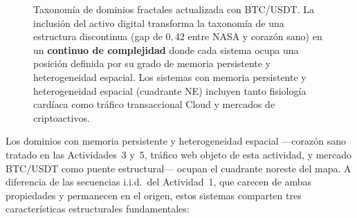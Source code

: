 \begin{figure}[H]
\caption{Taxonomía de dominios fractales actualizada con BTC/USDT. La inclusión
         del activo digital transforma la taxonomía de una estructura
         discontinua (gap de $0{,}42$ entre NASA y corazón sano) en un
         \textbf{continuo de complejidad} donde cada sistema ocupa una posición
         definida por su grado de memoria persistente y heterogeneidad espacial.
         Los sistemas con memoria persistente y heterogeneidad espacial
         (cuadrante NE) incluyen tanto fisiología cardíaca como tráfico
         transaccional Cloud y mercados de criptoactivos.}
\label{fig:taxonomia}
\end{figure}

Los dominios con memoria persistente y heterogeneidad espacial ---corazón sano
tratado en las Actividades~3 y~5, tráfico web objeto de esta actividad, y
mercado BTC/USDT como puente estructural--- ocupan el cuadrante noreste del
mapa. A diferencia de las secuencias i.i.d.\ del Actividad~1, que carecen de
ambas propiedades y permanecen en el origen, estos sistemas comparten tres
características estructurales fundamentales:

